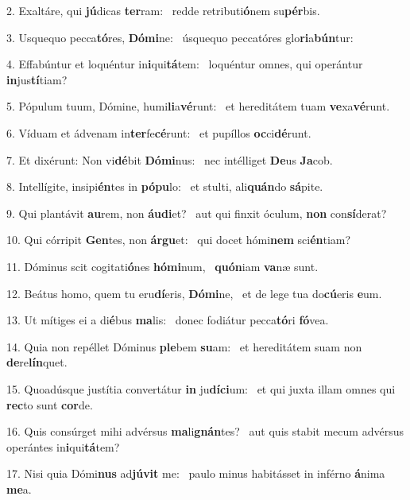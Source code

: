 2. Exaltáre, qui \textbf{jú}dicas \textbf{ter}ram: \ast\  redde retributi\textbf{ó}nem su\textbf{pér}bis.\

3. Usquequo pecca\textbf{tó}res, \textbf{Dó}\textbf{mi}ne: \ast\  úsquequo peccatóres glo\textbf{ri}a\textbf{bún}tur:\

4. Effabúntur et loquéntur in\textbf{i}qui\textbf{tá}tem: \ast\  loquéntur omnes, qui operántur \textbf{in}jus\textbf{tí}tiam?\

5. Pópulum tuum, Dómine, humi\textbf{li}a\textbf{vé}runt: \ast\  et hereditátem tuam \textbf{ve}xa\textbf{vé}runt.\

6. Víduam et ádvenam in\textbf{ter}fe\textbf{cé}runt: \ast\  et pupíllos \textbf{oc}ci\textbf{dé}runt.\

7. Et dixérunt: Non vi\textbf{dé}bit \textbf{Dó}\textbf{mi}nus: \ast\  nec intélliget \textbf{De}us \textbf{Ja}cob.\

8. Intellígite, insipi\textbf{én}tes in \textbf{pó}\textbf{pu}lo: \ast\  et stulti, ali\textbf{quán}do \textbf{sá}pite.\

9. Qui plantávit \textbf{au}rem, non \textbf{áu}\textbf{di}et? \ast\  aut qui finxit óculum, \textbf{non} con\textbf{sí}derat?\

10. Qui córripit \textbf{Gen}tes, non \textbf{ár}\textbf{gu}et: \ast\  qui docet hómi\textbf{nem} sci\textbf{én}tiam?\

11. Dóminus scit cogitati\textbf{ó}nes \textbf{hó}\textbf{mi}num, \ast\  \textbf{quón}iam \textbf{va}næ sunt.\

12. Beátus homo, quem tu eru\textbf{dí}eris, \textbf{Dó}\textbf{mi}ne, \ast\  et de lege tua do\textbf{cú}eris \textbf{e}um.\

13. Ut mítiges ei a di\textbf{é}bus \textbf{ma}lis: \ast\  donec fodiátur pecca\textbf{tó}ri \textbf{fó}vea.\

14. Quia non repéllet Dóminus \textbf{ple}bem \textbf{su}am: \ast\  et hereditátem suam non \textbf{de}re\textbf{lín}quet.\

15. Quoadúsque justítia convertátur \textbf{in} ju\textbf{dí}\textbf{ci}um: \ast\  et qui juxta illam omnes qui \textbf{rec}to sunt \textbf{cor}de.\

16. Quis consúrget mihi advérsus \textbf{ma}li\textbf{gnán}tes? \ast\  aut quis stabit mecum advérsus operántes in\textbf{i}qui\textbf{tá}tem?\

17. Nisi quia Dómi\textbf{nus} ad\textbf{jú}\textbf{vit} me: \ast\  paulo minus habitásset in inférno \textbf{á}nima \textbf{me}a.\

